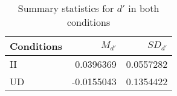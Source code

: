 \begin{table}

\caption{\label{tab:}Summary statistics for $d'$ in both conditions}
\centering
\begin{tabular}[t]{lrr}
\hline
Conditions & $M_{d'}$ & $SD_{d'}$\\
\hline
II & 0.0396369 & 0.0557282\\
UD & -0.0155043 & 0.1354422\\
\hline
\end{tabular}
\end{table}
